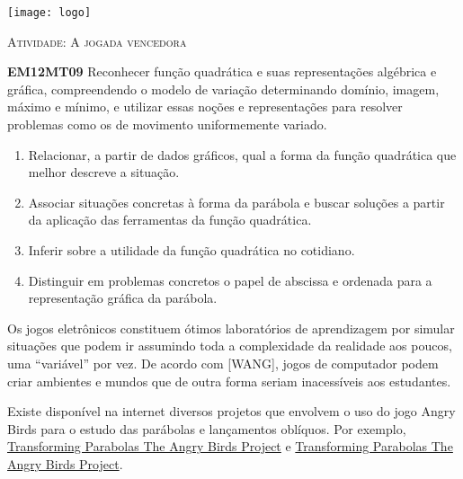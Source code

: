 \documentclass[10 pt,usenames,dvipsnames, oneside]{article}
\begin{document}
\begin{center}
  \begin{minipage}[l]{3cm}
\texttt{[image: logo]}    
\end{minipage}\hfill
\begin{minipage}[r]{.8\textwidth}
 {\Large \scshape Atividade: A jogada vencedora}  
\end{minipage}
\end{center}
\vspace{.2cm}

\ifdefined\prof
\begin{objetivos}
\item \textbf{EM12MT09} Reconhecer função quadrática e suas representações algébrica e gráfica, compreendendo o
modelo de variação determinando domínio, imagem, máximo e mínimo, e utilizar essas noções e
representações para resolver problemas como os de movimento uniformemente variado.
\end{objetivos}

\begin{goals}
\begin{enumerate}
\item Relacionar, a partir de dados gráficos, qual a forma da função quadrática que melhor descreve a situação.

\item {} 
Associar situações concretas à forma da parábola e buscar soluções a partir da aplicação das ferramentas da função quadrática.

\item {} 
Inferir sobre a utilidade da função quadrática no cotidiano.

\item {} 
Distinguir em problemas concretos o papel de abscissa e ordenada para a representação gráfica da parábola.
\end{enumerate}

\tcblower

Os jogos eletrônicos constituem ótimos laboratórios de aprendizagem por simular situações que podem ir assumindo toda a complexidade da realidade aos poucos, uma “variável” por vez. De acordo com {[}WANG{]}, jogos de computador podem criar ambientes e mundos que de outra forma seriam inacessíveis aos estudantes.

Existe disponível na internet diversos projetos que envolvem o uso do jogo Angry Birds para o estudo das parábolas e lançamentos oblíquos. Por exemplo, \href{https://algebra2coach.com/transforming-parabolas-angry-birds-project/}{Transforming Parabolas \textendash{} The Angry Birds Project} e \href{https://www.tes.com/teaching-resource/angry-bird-parabolas-graphing-quadratic-equations-6165424}{Transforming Parabolas \textendash{} The Angry Birds Project}.
\end{goals}
\end{document}
